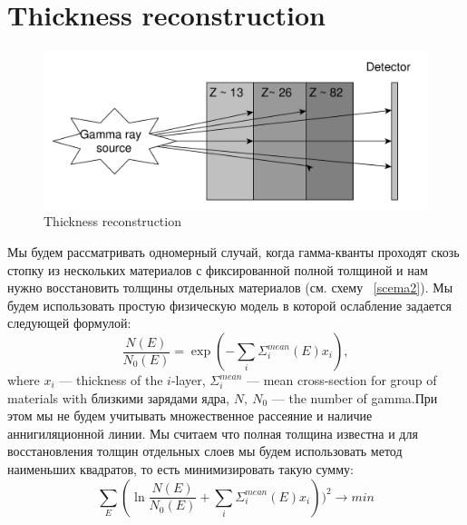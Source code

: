 \documentclass[a4paper]{panl}
\begin{document}
\section*{Thickness reconstruction}
\begin{figure} 
    \includegraphics[width=\linewidth]{figures/yed_schema_2.pdf}
    \vspace{-3mm}
    \caption{Thickness reconstruction}
    \vspace{-5mm}
\end{figure}
Мы будем рассматривать одномерный случай, когда гамма-кванты проходят скозь стопку из нескольких материалов с фиксированной полной толщиной и нам нужно восстановить толщины отдельных материалов (см. схему ~\ref{scema2}). Мы будем использовать простую физическую модель в которой ослабление задается  следующей формулой: 
\begin{equation}
\label{eq:gamma}
\frac{N(E)}{N_0(E)} = \exp(-\sum_i \Sigma^{mean}_i(E)x_i),
\end{equation}
where $x_i$ --- thickness of the $i$-layer, $\Sigma^{mean}_i$ --- mean cross-section for group of materials with близкими зарядами ядра, $N,~N_0$ --- the number of gamma.При этом мы не будем учитывать множественное рассеяние и наличие аннигиляционной линии. Мы считаем что полная толщина известна и для восстановления толщин отдельных слоев мы будем использовать метод наименьших квадратов, то есть минимизировать такую сумму:
\begin{equation}
\sum_E(\ln \frac{N(E)}{N_0(E)} + \sum_i \Sigma^{mean}_i(E)x_i))^2 \to min
\end{equation}
\end{document}
